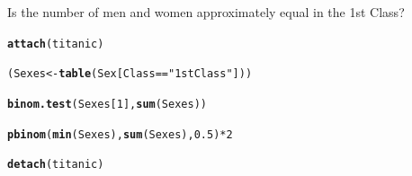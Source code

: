 \documentclass[12pt]{article}\usepackage[]{graphicx}\usepackage[]{xcolor}
\makeatletter
\newcommand{\hlnum}[1]{\textcolor[rgb]{0.686,0.059,0.569}{#1}}%
\newcommand{\hlsng}[1]{\textcolor[rgb]{0.192,0.494,0.8}{#1}}%
\newcommand{\hlopt}[1]{\textcolor[rgb]{0,0,0}{#1}}%
\newcommand{\hldef}[1]{\textcolor[rgb]{0.345,0.345,0.345}{#1}}%
\newcommand{\hlkwb}[1]{\textcolor[rgb]{0.69,0.353,0.396}{#1}}%
\newcommand{\hlkwd}[1]{\textcolor[rgb]{0.737,0.353,0.396}{\textbf{#1}}}%
\newenvironment{kframe}{%
 \def\at@end@of@kframe{}%
 \ifinner\ifhmode%
  \def\at@end@of@kframe{\end{minipage}}%
  \begin{minipage}{\columnwidth}%
 \fi\fi%
 \def\FrameCommand##1{\hskip\@totalleftmargin \hskip-\fboxsep
 \colorbox{shadecolor}{##1}\hskip-\fboxsep
     \hskip-\linewidth \hskip-\@totalleftmargin \hskip\columnwidth}%
 \MakeFramed {\advance\hsize-\width
   \@totalleftmargin\z@ \linewidth\hsize
   \@setminipage}}%
 {\par\unskip\endMakeFramed%
 \at@end@of@kframe}
\newenvironment{knitrout}{}{} %
\makeatother
\begin{document}
Is the number of men and women approximately equal in the 1st Class?
\begin{knitrout}
\color{fgcolor}\begin{kframe}
\begin{alltt}
\hlkwd{attach}\hldef{(titanic)}
\end{alltt}


{\ttfamily\noindent\bfseries\color{errorcolor}{\#\# Error:\\\#\# ! object 'titanic' not found}}\begin{alltt}
\hldef{(Sexes} \hlkwb{<-} \hlkwd{table}\hldef{(Sex[Class}\hlopt{==}\hlsng{"1st Class"}\hldef{]))}
\end{alltt}


{\ttfamily\noindent\bfseries\color{errorcolor}{\#\# Error:\\\#\# ! object 'Sex' not found}}\begin{alltt}
\hlkwd{binom.test}\hldef{(Sexes[}\hlnum{1}\hldef{],}\hlkwd{sum}\hldef{(Sexes))}
\end{alltt}


{\ttfamily\noindent\bfseries\color{errorcolor}{\#\# Error:\\\#\# ! object 'Sexes' not found}}\begin{alltt}
\hlkwd{pbinom}\hldef{(}\hlkwd{min}\hldef{(Sexes),}\hlkwd{sum}\hldef{(Sexes),}\hlnum{0.5}\hldef{)}\hlopt{*}\hlnum{2}
\end{alltt}


{\ttfamily\noindent\bfseries\color{errorcolor}{\#\# Error:\\\#\# ! object 'Sexes' not found}}\begin{alltt}
\hlkwd{detach}\hldef{(titanic)}
\end{alltt}


{\ttfamily\noindent\bfseries\color{errorcolor}{\#\# Error in `detach()`:\\\#\# ! invalid 'name' argument}}\end{kframe}
\end{knitrout}
\end{document}
